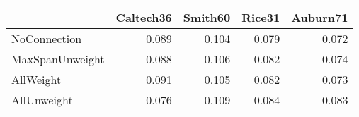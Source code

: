 \begin{tabular}{lrrrr}
\toprule
{} & Caltech36 & Smith60 & Rice31 & Auburn71 \\
\midrule
NoConnection    &     0.089 &   0.104 &  0.079 &    0.072 \\
MaxSpanUnweight &     0.088 &   0.106 &  0.082 &    0.074 \\
AllWeight       &     0.091 &   0.105 &  0.082 &    0.073 \\
AllUnweight     &     0.076 &   0.109 &  0.084 &    0.083 \\
\bottomrule
\end{tabular}
